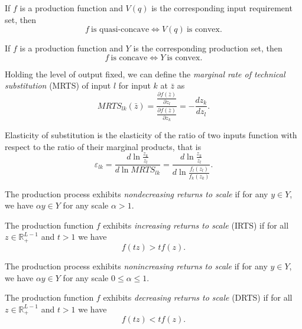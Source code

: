 \documentclass[12pt,fleqn]{book} %
\begin{document}
\begin{proposition}
If $f$ is a production function and $V(q)$ is the corresponding input requirement set, then
\[
f\ \text{is quasi-concave} \iff V(q)\ \text{is convex}.
\]
\end{proposition}	

\begin{proposition}
	If $f$ is a production function and $Y$ is the corresponding production set, then
	\[
	f\ \text{is concave} \iff Y\ \text{is convex}.
	\]	
\end{proposition}

\begin{definition}
Holding the level of output fixed, we can define the \emph{marginal rate of technical substitution} (MRTS) of input $l$ for input $k$ at $\bar{z}$ as
   \[
   MRTS_{lk}(\bar{z})=\frac{\frac{\partial f(\bar{z})}{\partial z_l}}{\frac{\partial f(\bar{z})}{\partial z_k}}=-\frac{dz_k}{dz_l}.
   \]
	
\end{definition}	
	
\begin{definition}
Elasticity of substitution is the elasticity of the ratio of two inputs function with respect to the ratio of their marginal products, that is
	\[
    \varepsilon_{lk}=\frac{d\ln\frac{z_k}{z_l}}{d\ln MRTS_{lk}}=\frac{d\ln\frac{z_k}{z_l}}{d\ln\frac{f_l(z_l)}{f_k(z_k )}}.
	\]
	
\end{definition}	


\begin{definition}
	The	production process exhibits \emph{nondecreasing returns to scale} if for any $y\in Y$, we have $\alpha y\in Y$ for any scale $\alpha > 1$. 
	
	The	production function $f$ exhibits \emph{increasing returns to scale} (IRTS) if for all $z\in\mathbb{R}_+^{L-1}$ and $t>1$ we have
	\[
		f(tz)> tf(z). 
	\]

\end{definition}

\begin{definition}
	The	production process exhibits \emph{nonincreasing returns to scale} if for any $y\in Y$, we have $\alpha y\in Y$ for any scale $0\le\alpha\le1$. 
	
	The	production function $f$ exhibits \emph{decreasing returns to scale} (DRTS) if for all $z\in\mathbb{R}_+^{L-1}$ and $t>1$ we have
    \[
    f(tz)< tf(z). 
    \]	
\end{definition}
\end{document}
